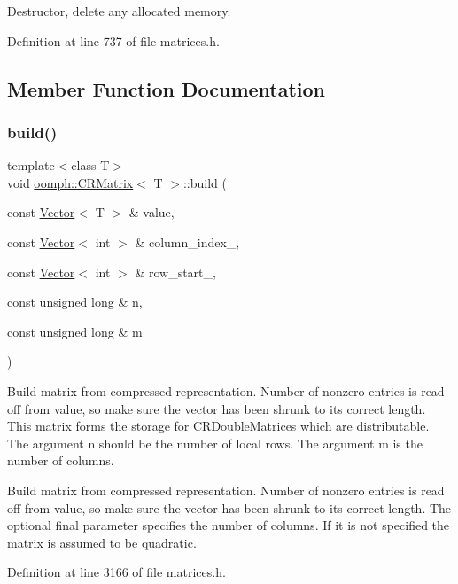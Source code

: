 Destructor, delete any allocated memory. 



Definition at line 737 of file matrices.\+h.



\subsection{Member Function Documentation}
\mbox{\label{classoomph_1_1CRMatrix_a73e05d0fc4fe5fb402416b18f17316b8}} 
\subsubsection{\texorpdfstring{build()}{build()}}
{\footnotesize\ttfamily template$<$class T$>$ \\
void \hyperlink{classoomph_1_1CRMatrix}{oomph\+::\+C\+R\+Matrix}$<$ T $>$\+::build (\begin{DoxyParamCaption}\item[{const \hyperlink{classoomph_1_1Vector}{Vector}$<$ T $>$ \&}]{value,  }\item[{const \hyperlink{classoomph_1_1Vector}{Vector}$<$ int $>$ \&}]{column\+\_\+index\+\_\+,  }\item[{const \hyperlink{classoomph_1_1Vector}{Vector}$<$ int $>$ \&}]{row\+\_\+start\+\_\+,  }\item[{const unsigned long \&}]{n,  }\item[{const unsigned long \&}]{m }\end{DoxyParamCaption})}



Build matrix from compressed representation. Number of nonzero entries is read off from value, so make sure the vector has been shrunk to its correct length. This matrix forms the storage for C\+R\+Double\+Matrices which are distributable. The argument n should be the number of local rows. The argument m is the number of columns. 

Build matrix from compressed representation. Number of nonzero entries is read off from value, so make sure the vector has been shrunk to its correct length. The optional final parameter specifies the number of columns. If it is not specified the matrix is assumed to be quadratic. 

Definition at line 3166 of file matrices.\+h.

